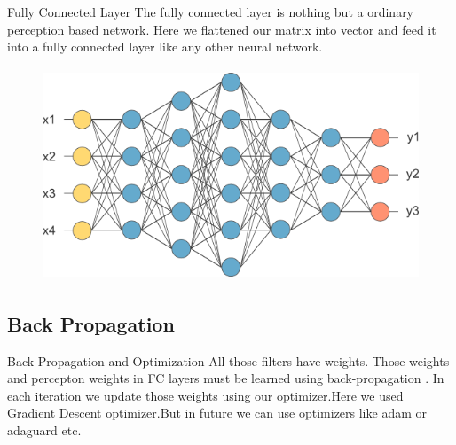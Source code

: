 \documentclass[10pt]{beamer}
\begin{document}
			\begin{frame}{Fully Connected Layer}
			The fully connected layer is nothing but a ordinary perception based network. Here  we flattened our matrix into vector and feed it into a fully connected layer like any other neural network.
			\begin{figure}
				\includegraphics[width=\linewidth,height=2.5in]{images/fc}
			\end{figure}

			\end{frame}
		\subsection{Back Propagation}
			\begin{frame}{Back Propagation and Optimization}
			All those filters have weights. Those weights and percepton weights in FC layers must be learned using back-propagation .
			In each iteration we update those weights using our optimizer.Here we used Gradient Descent optimizer.But in future we can use optimizers like adam or adaguard etc.
			
			\end{frame}
\end{document}
